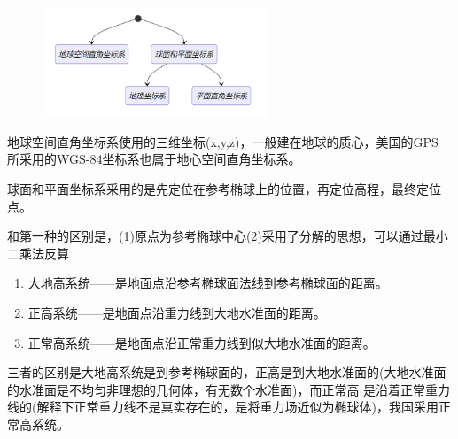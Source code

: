 \documentclass[12pt,a4paper]{article}
\begin{document}
    \begin{figure}[H]
        \centering
        \includegraphics[width = 0.6\textwidth]{./figures/6.png}
    \end{figure}

地球空间直角坐标系使用的三维坐标(x,y,z)，一般建在地球的质心，美国的GPS
所采用的WGS-84坐标系也属于地心空间直角坐标系。

球面和平面坐标系采用的是先定位在参考椭球上的位置，再定位高程，最终定位点。

和第一种的区别是，(1)原点为参考椭球中心\quad (2)采用了分解的思想，可以通过最小二乘法反算

\begin{enumerate}
    \item 大地高系统——是地面点沿参考椭球面法线到参考椭球面的距离。
    \item 正高系统——是地面点沿重力线到大地水准面的距离。
    \item 正常高系统——是地面点沿正常重力线到似大地水准面的距离。
\end{enumerate}
三者的区别是大地高系统是到参考椭球面的，正高是到大地水准面的(大地水准面的水准面是不均匀非理想的几何体，有无数个水准面)，而正常高
是沿着正常重力线的(解释下正常重力线不是真实存在的，是将重力场近似为椭球体)，我国采用正常高系统。
\newpage
\end{document}
